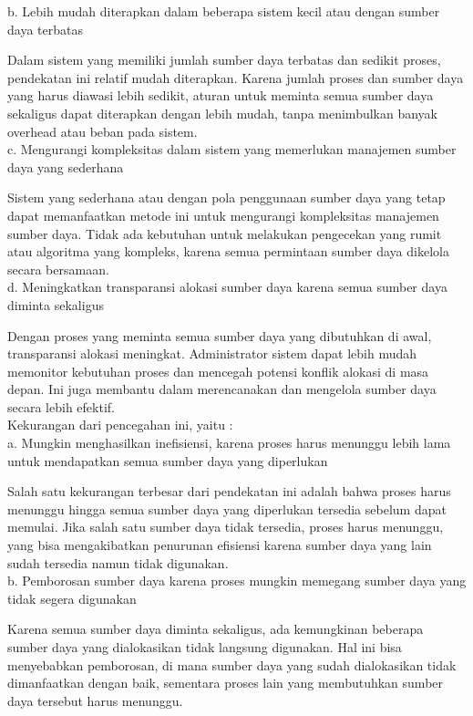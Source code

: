 \documentclass[12pt]{article}
\begin{document}
    b. Lebih mudah diterapkan dalam beberapa sistem kecil atau dengan sumber daya terbatas
    
    Dalam sistem yang memiliki jumlah sumber daya terbatas dan sedikit proses, pendekatan ini relatif mudah diterapkan. Karena jumlah proses dan sumber daya yang harus diawasi lebih sedikit, aturan untuk meminta semua sumber daya sekaligus dapat diterapkan dengan lebih mudah, tanpa menimbulkan banyak overhead atau beban pada sistem.\\

    c. Mengurangi kompleksitas dalam sistem yang memerlukan manajemen sumber daya yang sederhana
    
    Sistem yang sederhana atau dengan pola penggunaan sumber daya yang tetap dapat memanfaatkan metode ini untuk mengurangi kompleksitas manajemen sumber daya. Tidak ada kebutuhan untuk melakukan pengecekan yang rumit atau algoritma yang kompleks, karena semua permintaan sumber daya dikelola secara bersamaan.\\

    d. Meningkatkan transparansi alokasi sumber daya karena semua sumber daya diminta sekaligus
    
    Dengan proses yang meminta semua sumber daya yang dibutuhkan di awal, transparansi alokasi meningkat. Administrator sistem dapat lebih mudah memonitor kebutuhan proses dan mencegah potensi konflik alokasi di masa depan. Ini juga membantu dalam merencanakan dan mengelola sumber daya secara lebih efektif.\\

    Kekurangan dari pencegahan ini, yaitu :\\

    a. Mungkin menghasilkan inefisiensi, karena proses harus menunggu lebih lama untuk mendapatkan semua sumber daya yang diperlukan
    
    Salah satu kekurangan terbesar dari pendekatan ini adalah bahwa proses harus menunggu hingga semua sumber daya yang diperlukan tersedia sebelum dapat memulai. Jika salah satu sumber daya tidak tersedia, proses harus menunggu, yang bisa mengakibatkan penurunan efisiensi karena sumber daya yang lain sudah tersedia namun tidak digunakan.\\

    b. Pemborosan sumber daya karena proses mungkin memegang sumber daya yang tidak segera digunakan
    
    Karena semua sumber daya diminta sekaligus, ada kemungkinan beberapa sumber daya yang dialokasikan tidak langsung digunakan. Hal ini bisa menyebabkan pemborosan, di mana sumber daya yang sudah dialokasikan tidak dimanfaatkan dengan baik, sementara proses lain yang membutuhkan sumber daya tersebut harus menunggu.\\
\end{document}
